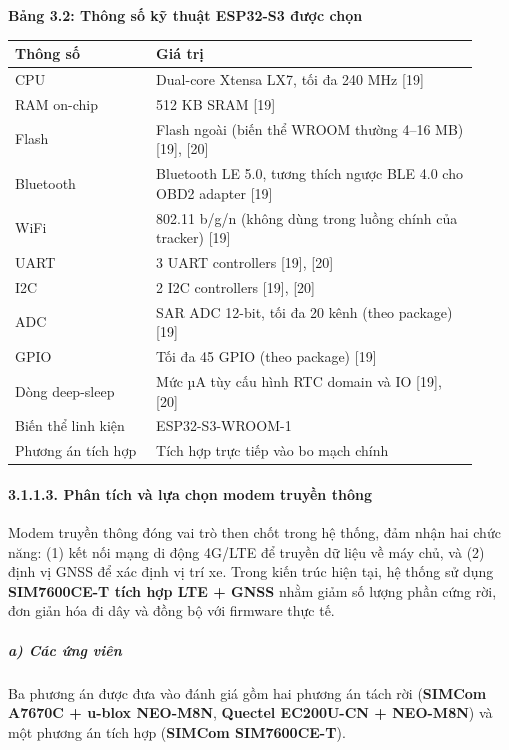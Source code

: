 \documentclass[13pt,a4paper]{extarticle}
\newcounter{none} %
\newcommand{\thesislongtableorignewline}{}
\let\thesislongtableorignewline\\
\renewcommand{\\}{\thesislongtableorignewline\hline}%
\let\\\thesislongtableorignewline
\newcommand{\thesistabletitle}[1]{%
  \begin{center}\textbf{#1}\end{center}%
}
\begin{document}
\thesistabletitle{Bảng 3.2: Thông số kỹ thuật ESP32-S3 được chọn}

{\def\LTcaptype{none} %
\begin{longtable}{|p{0.28\linewidth}|p{0.64\linewidth}|}
\hline \textbf{Thông số} & \textbf{Giá trị} \\
\hline
\endhead
\hline
\endlastfoot
CPU & Dual-core Xtensa LX7, tối đa 240 MHz {[}19{]} \\
RAM on-chip & 512 KB SRAM {[}19{]} \\
Flash & Flash ngoài (biến thể WROOM thường 4--16 MB) {[}19{]},
{[}20{]} \\
Bluetooth & Bluetooth LE 5.0, tương thích ngược BLE 4.0 cho OBD2 adapter
{[}19{]} \\
WiFi & 802.11 b/g/n (không dùng trong luồng chính của tracker)
{[}19{]} \\
UART & 3 UART controllers {[}19{]}, {[}20{]} \\
I2C & 2 I2C controllers {[}19{]}, {[}20{]} \\
ADC & SAR ADC 12-bit, tối đa 20 kênh (theo package) {[}19{]} \\
GPIO & Tối đa 45 GPIO (theo package) {[}19{]} \\
Dòng deep-sleep & Mức µA tùy cấu hình RTC domain và IO {[}19{]},
{[}20{]} \\
Biến thể linh kiện & ESP32-S3-WROOM-1 \\
Phương án tích hợp & Tích hợp trực tiếp vào bo mạch chính \\
\end{longtable}
}

\paragraph{3.1.1.3. Phân tích và lựa chọn modem truyền
thông}\label{3113-phuxe2n-tuxedch-vuxe0-lux1ef1a-chux1ecdn-modem-truyux1ec1n-thuxf4ng}

Modem truyền thông đóng vai trò then chốt trong hệ thống, đảm nhận hai
chức năng: (1) kết nối mạng di động 4G/LTE để truyền dữ liệu về máy chủ,
và (2) định vị GNSS để xác định vị trí xe. Trong kiến trúc hiện tại, hệ
thống sử dụng \textbf{SIM7600CE-T tích hợp LTE + GNSS} nhằm giảm số
lượng phần cứng rời, đơn giản hóa đi dây và đồng bộ với firmware thực
tế.

\subparagraph{a) Các ứng viên}\label{a-cuxe1c-ux1ee9ng-viuxean-1}

Ba phương án được đưa vào đánh giá gồm hai phương án tách rời
(\textbf{SIMCom A7670C + u-blox NEO-M8N}, \textbf{Quectel EC200U-CN +
NEO-M8N}) và một phương án tích hợp (\textbf{SIMCom SIM7600CE-T}).
\end{document}
